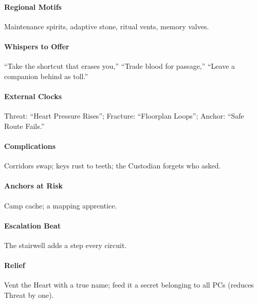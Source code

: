 \paragraph{Regional Motifs} Maintenance spirits, adaptive stone, ritual vents, memory valves.
\paragraph{Whispers to Offer} ``Take the shortcut that erases you,'' ``Trade blood for passage,'' ``Leave a companion behind as toll.''
\paragraph{External Clocks} Threat: ``Heart Pressure Rises''; Fracture: ``Floorplan Loops''; Anchor: ``Safe Route Fails.''
\paragraph{Complications} Corridors swap; keys rust to teeth; the Custodian forgets who asked.
\paragraph{Anchors at Risk} Camp cache; a mapping apprentice.
\paragraph{Escalation Beat} The stairwell adds a step every circuit.
\paragraph{Relief} Vent the Heart with a true name; feed it a secret belonging to all PCs (reduces Threat by one).

